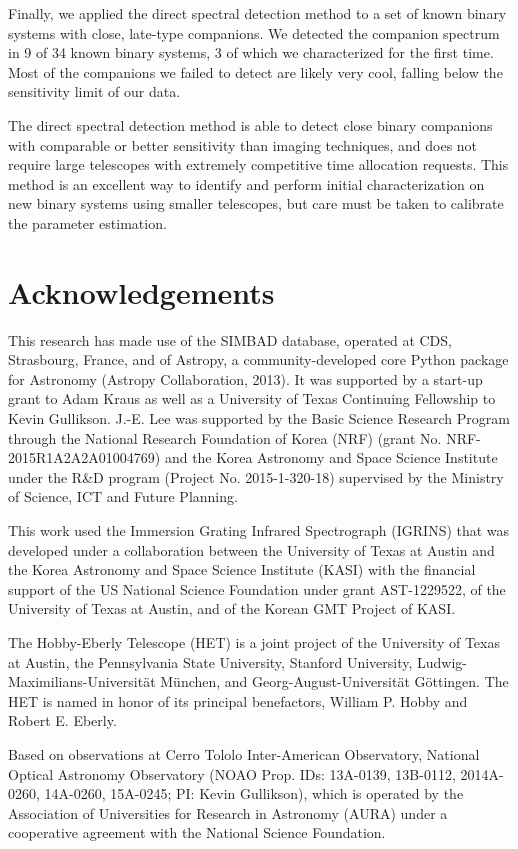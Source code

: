 Finally, we applied the direct spectral detection method to a set of known binary systems with close, late-type companions. We detected the companion spectrum in 9 of 34 known binary systems, 3 of which we characterized for the first time. Most of the companions we failed to detect are likely very cool, falling below the sensitivity limit of our data.

The direct spectral detection method is able to detect close binary companions with comparable or better sensitivity than imaging techniques, and does not require large telescopes with extremely competitive time allocation requests. This method is an excellent way to identify and perform initial characterization on new binary systems using smaller telescopes, but care must be taken to calibrate the parameter estimation. 

\section*{Acknowledgements}
This research has made use of the SIMBAD database, operated at CDS, Strasbourg, France, and of Astropy, a community-developed core Python package for Astronomy (Astropy Collaboration, 2013).
It was supported by a start-up grant to Adam Kraus as well as a University of Texas Continuing Fellowship to Kevin Gullikson. J.-E. Lee was supported by the Basic Science Research Program through the National Research Foundation of Korea (NRF) (grant No. NRF-2015R1A2A2A01004769) and the Korea
Astronomy and Space Science Institute under the R\&D program (Project No. 2015-1-320-18) supervised by the Ministry of Science, ICT and Future Planning.

This work used the Immersion Grating Infrared Spectrograph (IGRINS) that was developed under a collaboration between the University of Texas at Austin and the Korea Astronomy and Space Science Institute (KASI) with the financial support of the US National Science Foundation under grant AST-1229522, of the University of Texas at Austin, and of the Korean GMT Project of KASI.

The Hobby-Eberly Telescope (HET) is a joint project of the University of Texas at Austin, the Pennsylvania State University, Stanford University, Ludwig-Maximilians-Universit\"at M\"unchen, and Georg-August-Universit\"at G\"ottingen. The HET is named in honor of its principal benefactors, William P. Hobby and Robert E. Eberly.

Based on observations at Cerro Tololo Inter-American Observatory, National Optical Astronomy Observatory (NOAO Prop. IDs: 13A-0139, 13B-0112, 2014A-0260, 14A-0260, 15A-0245; PI: Kevin Gullikson), which is operated by the Association of Universities for Research in Astronomy (AURA) under a cooperative agreement with the National Science Foundation. 

